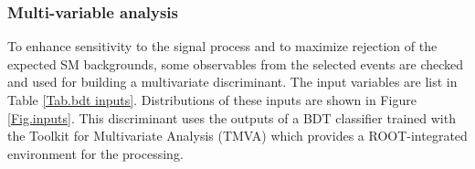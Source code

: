 \subsubsection{Multi-variable analysis}
\label{subsubsec:mva}

To enhance sensitivity to the signal process and to maximize rejection of the expected SM backgrounds, some observables from the selected events are checked and used for building a multivariate discriminant. The input variables are list in Table \ref{Tab.bdt inputs}. Distributions of these inputs are shown in Figure \ref{Fig.inputs}. This discriminant uses the outputs of a BDT classifier trained with the Toolkit for Multivariate Analysis (TMVA) which provides a ROOT-integrated environment for the processing.

